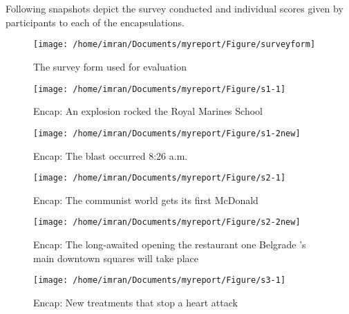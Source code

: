 \newpage 
\renewcommand{\thefigure}{A.\arabic{figure}} 
\renewcommand{\theequation}{A.\arabic{equation}} 
\renewcommand{\thetable}{A.\arabic{table}} 
\setcounter{figure}{0} 
\setcounter{equation}{0} 
\setcounter{table}{0} 
\chapter*{} 
Following snapshots depict the survey conducted and individual scores given by participants to each of the encapsulations.

\begin{figure}[h]
 \texttt{[image: /home/imran/Documents/myreport/Figure/surveyform]}
\caption{\singlespace The survey form used for evaluation}
\end{figure}

\begin{figure}[h]
 \texttt{[image: /home/imran/Documents/myreport/Figure/s1-1]}
\caption{\singlespace Encap: An explosion rocked the Royal Marines School}
\end{figure}

\begin{figure}[h]
\texttt{[image: /home/imran/Documents/myreport/Figure/s1-2new]}
\caption{\singlespace Encap: The blast occurred 8:26 a.m. }
\end{figure}

\begin{figure}[h]
 \texttt{[image: /home/imran/Documents/myreport/Figure/s2-1]}
\caption{\singlespace Encap: The communist world gets its first McDonald}
\end{figure}

\begin{figure}[h]
 \texttt{[image: /home/imran/Documents/myreport/Figure/s2-2new]}
\caption{\singlespace Encap: The long-awaited opening the restaurant one Belgrade 's main downtown squares will take place}
\end{figure}

\begin{figure}[h]
 \texttt{[image: /home/imran/Documents/myreport/Figure/s3-1]}
\caption{\singlespace Encap: New treatments that stop a heart attack}

\end{figure}

